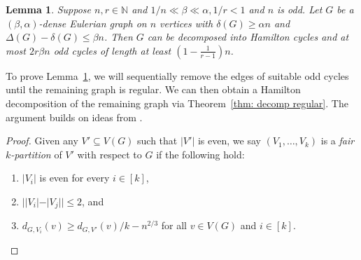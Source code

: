 \documentclass[a4paper, 11pt, reqno]{amsart}
\newtheorem{lemma}[definition]{Lemma}
\numberwithin{equation}{section}
\newcommand{\1}{{\rm 1\hspace*{-0.4ex}%
\rule{0.1ex}{1.52ex}\hspace*{0.2ex}}}
\newcommand{\N}{\mathbb N}
\newcommand{\COMMENT}[1]{}
\begin{document}
\begin{lemma}\label{lem: decomp Eulerian}
Suppose $n,r\in \N$ and $1/n \ll \beta \ll \alpha , 1/r< 1$ and $n$ is odd.\COMMENT{since $1/r<1$, we have $r\geq 2$.}
Let $G$ be a $(\beta,\alpha)$-dense Eulerian graph on $n$ vertices with $\delta(G)\geq \alpha n$ and $\Delta(G)-\delta(G) \leq \beta n$.
Then $G$ can be decomposed into Hamilton cycles and at most $2r\beta n$ odd cycles of length at least $(1- \frac{1}{r-1})n$.
\end{lemma}
To prove Lemma~\ref{lem: decomp Eulerian}, we will sequentially remove the edges of suitable odd cycles until the remaining graph is regular. We can then obtain a Hamilton decomposition of the remaining graph via Theorem~\ref{thm: decomp regular}. 
The argument builds on ideas from \cite{GKO16}.
\begin{proof}
Given any $V'\subseteq V(G)$ such that $|V'|$ is even, we say $(V_1,\dots, V_k)$ is a {\em fair $k$-partition} of $V'$ with respect to $G$ if the following hold:
\begin{enumerate}[label=(\alph*)]
\item $|V_i|$ is even for every $i\in [k]$,
\item $||V_i|-|V_j||\leq 2$, and
\item  $d_{G,V_i}(v) \geq d_{G,V'}(v)/k-n^{2/3}$ for all $v\in V(G)$ and $i\in [k]$.
\end{enumerate}


\end{proof}
\end{document}
